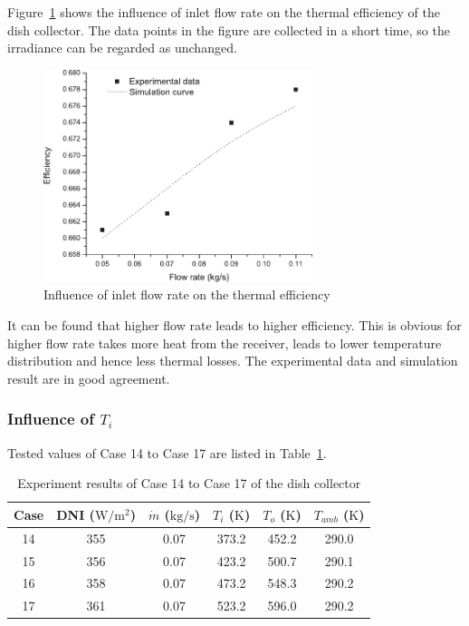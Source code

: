 Figure~\ref{fig:q_m-eta} shows the influence of inlet flow rate on the thermal efficiency of the dish collector. The data points in the figure are collected in a short time, so the irradiance can be regarded as unchanged.
\begin{figure}[!ht]
\centering
\includegraphics[width=0.7\textwidth]{fig/q_m-eta}
\caption{Influence of inlet flow rate on the thermal efficiency}
\label{fig:q_m-eta}
\end{figure}

It can be found that higher flow rate leads to higher efficiency. This is obvious for higher flow rate takes more heat from the receiver, leads to lower temperature distribution and hence less thermal losses. The experimental data and simulation result are in good agreement.

\subsubsection{Influence of $T_i$}

Tested values of Case 14 to Case 17 are listed in Table~\ref{tab:ResultOfDish3}.

\begin{table}[htbp]\footnotesize
	\caption{Experiment results of Case 14 to Case 17 of the dish collector}
	\begin{center}
	\begin{tabular}{cccccc}
		\toprule
		Case	& DNI ($\mathrm{W/m^2}$)	&	$\dot{m}$ ($\mathrm{kg/s}$)			&	$T_i$ ($\mathrm{K}$)	&	$T_o$ ($\mathrm{K}$)		&	$T_{amb}$ ($\mathrm{K}$)\\
		\midrule
		14	&	355	&	0.07	&	373.2	&	452.2	&	290.0\\
		15	&	356	&	0.07	&	423.2	&	500.7	&	290.1\\
		16	&	358	&	0.07	&	473.2	&	548.3	&	290.2	\\
		17	&	361	&	0.07	&	523.2	&	596.0	&	290.2\\
		\bottomrule
	\end{tabular}
	\end{center}
	\label{tab:ResultOfDish3}
\end{table}

